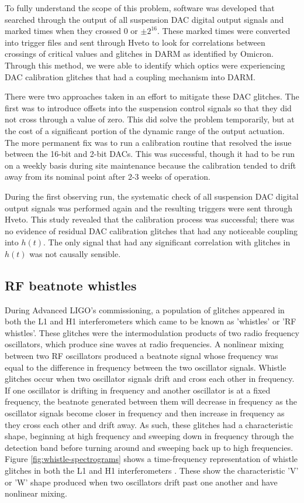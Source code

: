 To fully understand the scope of this problem, 
software was developed that searched through the output of all suspension 
DAC digital output signals and marked times when they crossed 0 or $\pm2^{16}$. 
These marked times were converted into trigger files and sent through Hveto 
to look for correlations between crossings of critical values and glitches 
in DARM as identified by Omicron. Through this method, we were able to identify 
which optics were experiencing DAC calibration glitches that had a coupling 
mechanism into DARM.

There were two approaches taken in an effort to mitigate these DAC glitches. The 
first was to introduce offsets into the suspension control signals so that they 
did not cross through a value of zero. This did solve the problem temporarily, 
but at the cost of a significant portion of the dynamic range of the output 
actuation. The more permanent fix was to run a calibration routine 
that resolved the issue between the 16-bit and 2-bit DACs. This was 
successful, though it had to be run on a weekly basis during site maintenance 
because the calibration tended to drift away from its nominal point after 
2-3 weeks of operation.

During the first observing run, the systematic check of all suspension DAC 
digital output signals was performed again and the resulting triggers were 
sent through Hveto. This study revealed that the calibration process was 
successful; there was no evidence of residual DAC calibration glitches that 
had any noticeable coupling into $h(t)$. The only signal that had any 
significant correlation with glitches in $h(t)$ was not causally sensible. 

\subsection{RF beatnote whistles}

During Advanced LIGO's commissioning,
a population of glitches appeared in both the L1 and H1 interferometers which 
came to be known as 'whistles' or 'RF whistles'. These glitches were the 
intermodulation products of two radio frequency oscillators, which 
produce sine waves at radio frequencies.  A nonlinear mixing between two 
RF oscillators produced a beatnote signal whose frequency was equal to the 
difference in frequency between the two oscillator signals. Whistle glitches 
occur when two oscillator signals drift and cross each other in frequency. 
If one oscillator 
is drifting in frequency and another oscillator is at a fixed frequency, 
the beatnote generated between them will decrease in frequency as the 
oscillator signals become closer in frequency and then increase in frequency 
as they cross each other and drift away. 
As such, these glitches 
had a characteristic shape, beginning at high frequency and sweeping down 
in frequency through the detection band before turning around and 
sweeping back up to high frequencies. Figure \ref{fig:whistle-spectrograms} 
shows a time-frequency representation of whistle glitches in both the L1 and H1 
interferometers \cite{Nuttall:2015dqa}. 
These show the characteristic 'V' or 'W' shape produced 
when two oscillators drift past one another and have nonlinear mixing.

